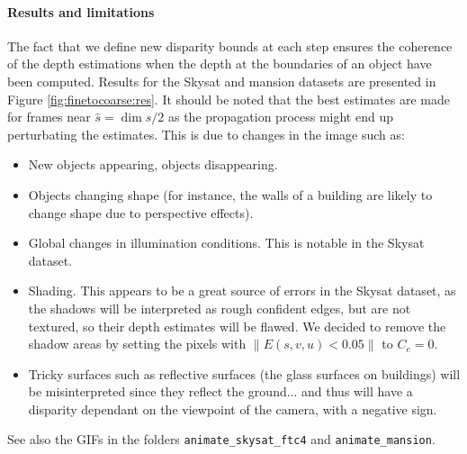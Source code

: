\documentclass{article}
\newcommand{\norm}[1]{\left\lVert#1\right\rVert}
\theoremstyle{definition}
\begin{document}
\paragraph{Results and limitations} The fact that we define new disparity bounds at each step ensures the coherence of the depth estimations when the depth at the boundaries of an object have been computed. Results for the Skysat and mansion datasets are presented in Figure \ref{fig:finetocoarse:res}. It should be noted that the best estimates are made for frames near $\widehat{s} = \dim s / 2$ as the propagation process might end up perturbating the estimates. This is due to changes in the image such as:
\begin{itemize}
 \item New objects appearing, objects disappearing.
 \item Objects changing shape (for instance, the walls of a building are likely to change shape due to perspective effects).
 \item Global changes in illumination conditions. This is notable in the Skysat dataset.
 \item Shading. This appears to be a great source of errors in the Skysat dataset, as the shadows will be interpreted as rough confident edges, but are not textured, so their depth estimates will be flawed. We decided to remove the shadow areas by setting the pixels with $\norm{E(s, v, u) < 0.05}$ to $C_e = 0$.
 \item Tricky surfaces such as reflective surfaces (the glass surfaces on buildings) will be misinterpreted since they reflect the ground... and thus will have a disparity dependant on the viewpoint of the camera, with a negative sign.
\end{itemize}


See also the GIFs in the folders \verb#animate_skysat_ftc4# and \verb#animate_mansion#.
\end{document}
